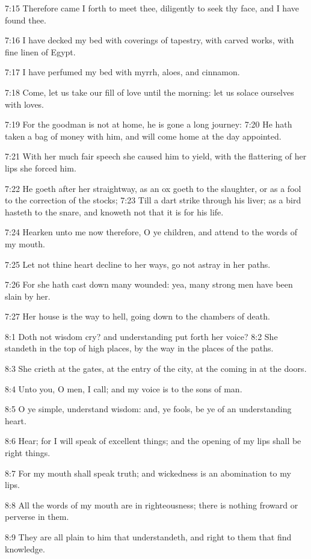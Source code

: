 7:15 Therefore came I forth to meet thee, diligently to seek thy face,
and I have found thee.

7:16 I have decked my bed with coverings of tapestry, with carved
works, with fine linen of Egypt.

7:17 I have perfumed my bed with myrrh, aloes, and cinnamon.

7:18 Come, let us take our fill of love until the morning: let us
solace ourselves with loves.

7:19 For the goodman is not at home, he is gone a long journey: 7:20
He hath taken a bag of money with him, and will come home at the day
appointed.

7:21 With her much fair speech she caused him to yield, with the
flattering of her lips she forced him.

7:22 He goeth after her straightway, as an ox goeth to the slaughter,
or as a fool to the correction of the stocks; 7:23 Till a dart strike
through his liver; as a bird hasteth to the snare, and knoweth not
that it is for his life.

7:24 Hearken unto me now therefore, O ye children, and attend to the
words of my mouth.

7:25 Let not thine heart decline to her ways, go not astray in her
paths.

7:26 For she hath cast down many wounded: yea, many strong men have
been slain by her.

7:27 Her house is the way to hell, going down to the chambers of
death.

8:1 Doth not wisdom cry? and understanding put forth her voice?  8:2
She standeth in the top of high places, by the way in the places of
the paths.

8:3 She crieth at the gates, at the entry of the city, at the coming
in at the doors.

8:4 Unto you, O men, I call; and my voice is to the sons of man.

8:5 O ye simple, understand wisdom: and, ye fools, be ye of an
understanding heart.

8:6 Hear; for I will speak of excellent things; and the opening of my
lips shall be right things.

8:7 For my mouth shall speak truth; and wickedness is an abomination
to my lips.

8:8 All the words of my mouth are in righteousness; there is nothing
froward or perverse in them.

8:9 They are all plain to him that understandeth, and right to them
that find knowledge.

